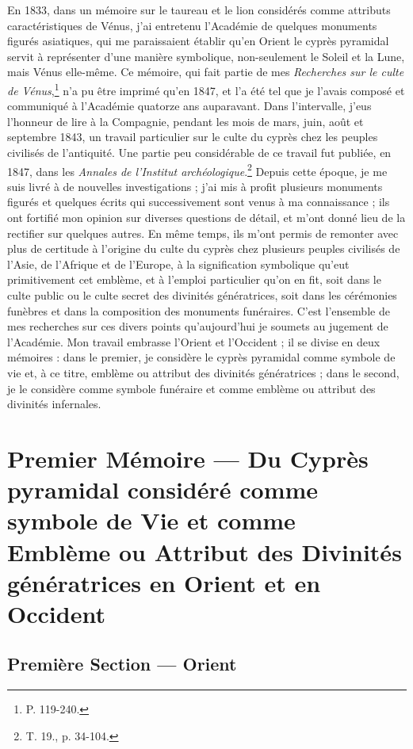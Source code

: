 \documentclass{article}
\begin{document}
En 1833, dans un mémoire sur le taureau et le lion considérés comme attributs caractéristiques de Vénus, j'ai entretenu l'Académie de quelques monuments figurés asiatiques, qui me paraissaient établir qu'en Orient le cyprès pyramidal servit à représenter d'une manière symbolique, non-seulement le Soleil et la Lune, mais Vénus elle-même. Ce mémoire, qui fait partie de mes \emph{Recherches sur le culte de Vénus},\footnote{P. 119-240.} n'a pu être imprimé qu'en 1847, et l'a été tel que je l'avais composé et communiqué à l'Académie quatorze ans auparavant. Dans l'intervalle, j'eus l'honneur de lire à la Compagnie, pendant les mois de mars, juin, août et septembre 1843, un travail particulier sur le culte du cyprès chez les peuples civilisés de l'antiquité. Une partie peu considérable de ce travail fut publiée, en 1847, dans les \emph{Annales de l'Institut archéologique}.\footnote{T. 19., p. 34-104.} Depuis cette époque, je me suis livré à de nouvelles investigations ; j'ai mis à profit plusieurs monuments figurés et quelques écrits qui successivement sont venus à ma connaissance ; ils ont fortifié mon opinion sur diverses questions de détail, et m'ont donné lieu de la rectifier sur quelques autres. En même temps, ils m'ont permis de remonter avec plus de certitude à l'origine du culte du cyprès chez plusieurs peuples civilisés de l'Asie, de l'Afrique et de l'Europe, à la signification symbolique qu'eut primitivement cet emblème, et à l'emploi particulier qu'on en fit, soit dans le culte public ou le culte secret des divinités génératrices, soit dans les cérémonies funèbres et dans la composition des monuments funéraires. C'est l'ensemble de mes recherches sur ces divers points qu'aujourd'hui je soumets au jugement de l'Académie. Mon travail embrasse l'Orient et l'Occident ; il se divise en deux mémoires : dans le premier, je considère le cyprès pyramidal comme symbole de vie et, à ce titre, emblème ou attribut des divinités génératrices ; dans le second, je le considère comme symbole funéraire et comme emblème ou attribut des divinités infernales.
\clearpage
\section{Premier Mémoire --- Du Cyprès pyramidal considéré comme symbole de Vie et comme Emblème ou Attribut des Divinités génératrices en Orient et en Occident}
\subsection{Première Section --- Orient}
\end{document}
